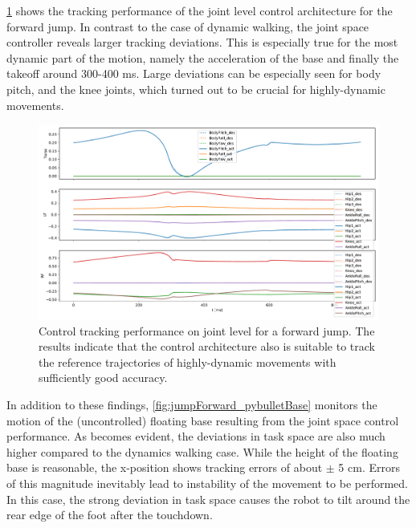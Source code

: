 \ref{fig:jumpForward_pybulletTracking} shows the tracking performance of the joint level control architecture for the forward jump. In contrast to the case of dynamic walking, the joint space controller reveals larger tracking deviations. This is especially true for the most dynamic part of the motion, namely the acceleration of the base and finally the takeoff around 300-400 ms. Large deviations can be especially seen for body pitch, and the knee joints, which turned out to be crucial for highly-dynamic movements. 

\begin{figure}[h!]
\centering	
\includegraphics[width=1\textwidth]{fig/jumpForward/pybullet/pybulletTracking}
\caption[Control tracking performance on joint level for a forward jump]{Control tracking performance on joint level for a forward jump. The results indicate that the control architecture also is suitable to track the reference trajectories of highly-dynamic movements with sufficiently good accuracy.}
\label{fig:jumpForward_pybulletTracking}
\end{figure}

In addition to these findings, \cref{fig:jumpForward_pybulletBase} monitors the motion of the (uncontrolled) floating base resulting from the joint space control performance. As becomes evident, the deviations in task space are also much higher compared to the dynamics walking case. While the height of the floating base is reasonable, the x-position shows tracking errors of about $\pm$ 5 cm. Errors of this magnitude inevitably lead to instability of the movement to be performed. In this case, the strong deviation in task space causes the robot to tilt around the rear edge of the foot after the touchdown. 

